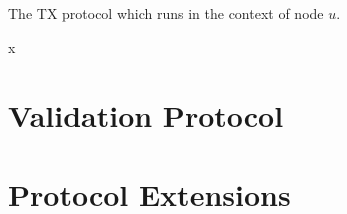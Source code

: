 \begin{algorithm}
    \caption{The TX protocol which runs in the context of node $u$.}
    \label{alg:tx-proto}

    \begin{algorithmic}
        \State x
        \EndFunction

    \end{algorithmic}

\end{algorithm}

\section{Validation Protocol}
\label{sec:vd-protocol}


\section{Protocol Extensions}
\label{sec:protocol-extensions}





